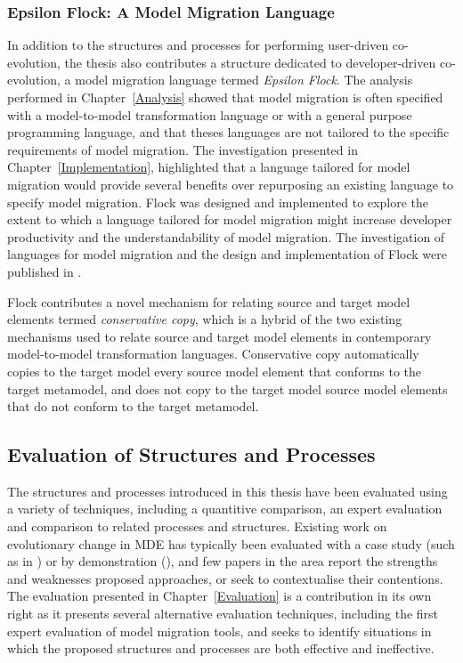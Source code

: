 \subsubsection{Epsilon Flock: A Model Migration Language}
In addition to the structures and processes for performing user-driven co-evolution, the thesis also contributes a structure dedicated to developer-driven co-evolution, a model migration language termed \emph{Epsilon Flock}. The analysis performed in Chapter~\ref{Analysis} showed that model migration is often specified with a model-to-model transformation language or with a general purpose programming language, and that theses languages are not tailored to the specific requirements of model migration. The investigation presented in Chapter~\ref{Implementation}, highlighted that a language tailored for model migration would provide several benefits over repurposing an existing language to specify model migration. Flock was designed and implemented to explore the extent to which a language tailored for model migration might increase developer productivity and the understandability of model migration. The investigation of languages for model migration and the design and implementation of Flock were published in \cite{rose10flock}.

Flock contributes a novel mechanism for relating source and target model elements termed \emph{conservative copy}, which is a hybrid of the two existing mechanisms used to relate source and target model elements in contemporary model-to-model transformation languages. Conservative copy automatically copies to the target model every source model element that conforms to the target metamodel, and does not copy to the target model source model elements that do not conform to the target metamodel.


\subsection{Evaluation of Structures and Processes}
The structures and processes introduced in this thesis have been evaluated using a variety of techniques, including a quantitive comparison, an expert evaluation and comparison to related processes and structures. Existing work on evolutionary change in MDE has typically been evaluated with a case study (such as in \cite{sprinkle03thesis}) or by demonstration (\cite{cicchetti08thesis}), and few papers in the area report the strengths and weaknesses proposed approaches, or seek to contextualise their contentions. The evaluation presented in Chapter~\ref{Evaluation} is a contribution in its own right as it presents several alternative evaluation techniques, including the first expert evaluation of model migration tools, and seeks to identify situations in which the proposed structures and processes are both effective and ineffective.

